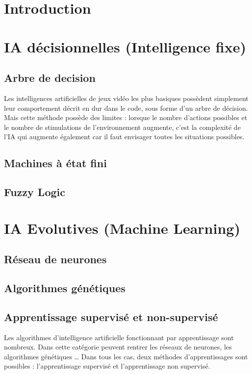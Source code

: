 \documentclass[asi]{picINSA}
\begin{document}
	
	\couverture{}

\tableofcontents{}

\chapter{Introduction}

\chapter{IA décisionnelles (Intelligence fixe)}
\section{Arbre de decision}
Les intelligences artificielles de jeux vidéo les plus basiques possèdent simplement leur comportement décrit en dur dans le code, sous forme d'un arbre de décision. \\
 Mais cette méthode possède des limites : lorsque le nombre d'actions possibles et le nombre de stimulations de l'environnement augmente, c'est la complexité de l'IA qui augmente également car il faut envisager toutes les situations possibles.

\section{Machines à état fini}
\section{Fuzzy Logic}
  
\chapter{IA Evolutives (Machine Learning)}
\section{Réseau de neurones}

\section{Algorithmes génétiques}
\section{Apprentissage supervisé et non-supervisé}
Les algorithmes d'intelligence artificielle fonctionnant par apprentissage sont nombreux. Dans cette catégorie peuvent rentrer les réseaux de neurones, les algorithmes génétiques … Dans tous les cas, deux méthodes d'apprentissages sont possibles : l'apprentissage supervisé et l'apprentissage non supervisé.
\end{document}
